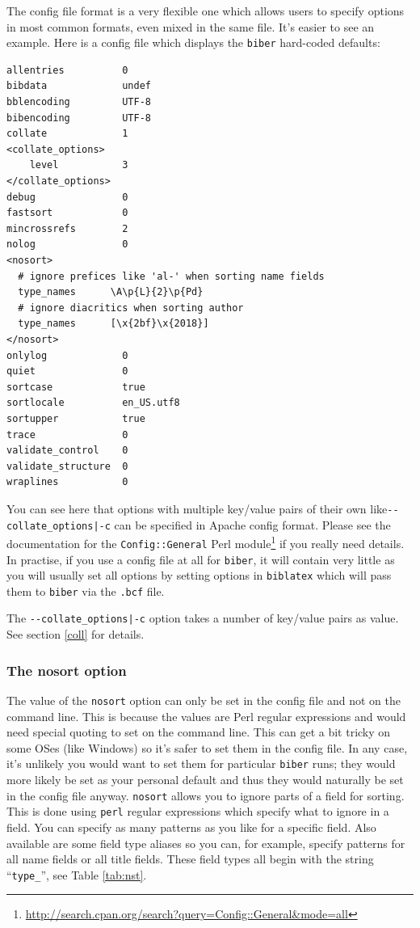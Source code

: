 \documentclass{ltxdockit}
\begin{document}
\noindent The config file format is a very flexible one which allows users to specify
options in most common formats, even mixed in the same file. It's easier to
see an example. Here is a config file which displays the \verb+biber+
hard-coded defaults:

\begin{verbatim}
allentries          0
bibdata             undef 
bblencoding         UTF-8
bibencoding         UTF-8
collate             1
<collate_options>
    level           3
</collate_options>
debug               0
fastsort            0
mincrossrefs        2
nolog               0
<nosort>
  # ignore prefices like 'al-' when sorting name fields
  type_names      \A\p{L}{2}\p{Pd}
  # ignore diacritics when sorting author
  type_names      [\x{2bf}\x{2018}]
</nosort>
onlylog             0
quiet               0
sortcase            true
sortlocale          en_US.utf8
sortupper           true
trace               0
validate_control    0
validate_structure  0
wraplines           0
\end{verbatim}

\noindent You can see here that options with multiple key/value pairs of
their own like\linebreak[4] \verb+--collate_options|-c+ can be specified in
Apache config format. Please see the documentation
for the \verb+Config::General+ Perl
module\footnote{\url{http://search.cpan.org/search?query=Config::General&mode=all}}
if you really need details. In practise, if you use a config file at all
for \verb+biber+, it will contain very little as you will usually set all
options by setting options in \verb+biblatex+ which will pass them to
\verb+biber+ via the \verb+.bcf+ file.

The \verb+--collate_options|-c+ option takes a number of key/value pairs as
value. See section \ref{coll} for details.

\subsubsection{The nosort option}

The value of the \verb+nosort+ option can only be set in the config file
and not on the command line. This is because the values are Perl regular
expressions and would need special quoting to set on the command line. This
can get a bit tricky on some OSes (like Windows) so it's safer to set them
in the config file. In any case, it's unlikely you would want to set them
for particular \verb+biber+ runs; they would more likely be set as your
personal default and thus they would naturally be set in the config file
anyway. \verb+nosort+ allows you to ignore parts of a field for sorting.
This is done using \verb+perl+ regular expressions which specify what to
ignore in a field. You can specify as many patterns as you like for a
specific field. Also available are some field type aliases so you can, for
example, specify patterns for all name fields or all title fields. These
field types all begin with the string ``\verb+type_+'', see Table
\ref{tab:nst}.
\end{document}
